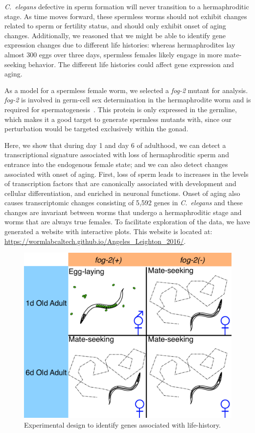 \documentclass[10pt,letterpaper,twocolumn]{article}
\newcommand{\cel}{\emph{C.~elegans}}
\newcommand{\fog}{\emph{fog-2}}
\newcommand{\agen}{5,592}
\newcommand{\website}{\url{https://wormlabcaltech.github.io/Angeles_Leighton_2016/}}
\begin{document}
\cel{} defective in sperm formation will never transition to a hermaphroditic stage. As time moves forward, these spermless worms should not exhibit changes related to sperm or fertility status, and should only exhibit onset of aging changes. Additionally, we reasoned that we might be able to identify gene expression changes due to different life histories: whereas hermaphrodites lay almost 300 eggs over three days, spermless females likely engage in more mate-seeking behavior. The different life histories could affect gene expression and aging.

As a model for a spermless female worm, we selected a \fog{} mutant for analysis. \fog{} is involved in germ-cell sex determination in the hermaphrodite worm and is required for spermatogenesis~\cite{Schedl1988,Clifford2000}. This protein is only expressed in the germline, which makes it a good target to generate spermless mutants with, since our perturbation would be targeted exclusively within the gonad.

Here, we show that during day 1 and day 6 of adulthood, we can detect a transcriptional signature associated with loss of hermaphroditic sperm and entrance into the endogenous female state; and we can also detect changes associated with onset of aging. First, loss of sperm leads to increases in the levels of transcription factors that are canonically associated with development and cellular differentiation, and enriched in neuronal functions.
Onset of aging also causes transcriptomic changes consisting of \agen{} genes in \cel{} and these changes are invariant between worms that undergo a hermaphroditic stage and worms that are always true females. To facilitate exploration of the data, we have generated a website with interactive plots. This website is located at: \website{}.

\begin{figure}[htbp]
\renewcommand{\familydefault}{\sfdefault}\normalfont{}
\centering
\captionsetup{width=\linewidth}
\includegraphics[width=\linewidth]{../output/figs/final_figs/worm_life_fog2_vs_n2.pdf}
\caption{Experimental design to identify genes associated with life-history.
}%
\label{fig:wormlife}
\end{figure}
\end{document}
